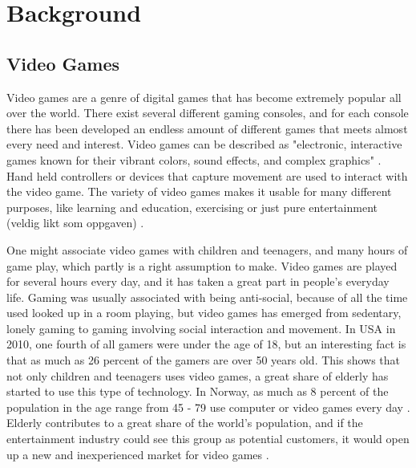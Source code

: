 \chapter{Background}
\section{Video Games}

Video games are a genre of digital games that has become extremely popular all over the world. There exist several different gaming consoles, and for each console there has been developed an endless amount of different games that meets almost every need and interest. Video games can be described as "electronic, interactive games known for their vibrant colors, sound effects, and complex graphics" \cite{videogamedef}. Hand held controllers or devices that capture movement are used to interact with the video game. The variety of video games makes it usable for many different purposes, like learning and education, exercising or just pure entertainment (veldig likt som oppgaven) \cite{project}. 

One might associate video games with children and teenagers, and many hours of game play, which partly is a right assumption to make. Video games are played for several hours every day, and it has taken a great part in people's everyday life. Gaming was usually associated with being anti-social, because of all the time used looked up in a room playing, but video games has emerged from sedentary, lonely gaming to gaming involving social interaction and movement. In USA in 2010, one fourth of all gamers were under the age of 18, but an interesting fact is that as much as 26 percent of the gamers are over 50 years old. This shows that not only children and teenagers uses video games, a great share of elderly has started to use this type of technology. In Norway,  as much as 8 percent of the population in the age range from 45 - 79 use computer or video games every day \cite{project}. Elderly contributes to a great share of the world's population, and if the entertainment industry could see this group as potential customers, it would open up a new and inexperienced market for video games \cite{ijsselsteijn2007digital}. 

